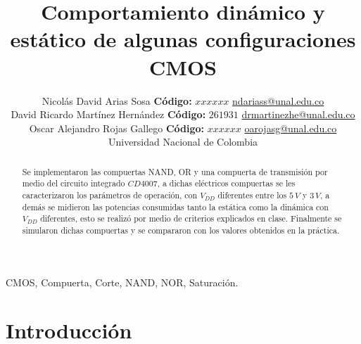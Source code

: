 \documentclass[twocolumn]{IEEEtran}
\begin{document}
\title{Comportamiento dinámico y estático de algunas configuraciones CMOS}
\author{Nicolás David Arias Sosa \textbf{Código:} $xxxxxx$ \url{ndariass@unal.edu.co}\\
	David Ricardo Martínez Hernández \textbf{Código:} $261931$ \url{drmartinezhe@unal.edu.co}\\
	Oscar Alejandro Rojas Gallego \textbf{Código:} $xxxxxx$ \url{oarojasg@unal.edu.co}\\
	Universidad Nacional de Colombia}
\maketitle
\begin{abstract}
 Se implementaron las compuertas NAND, OR y una compuerta de transmisión por medio del circuito integrado $CD4007$, a dichas eléctricos compuertas se les caracterizaron los parámetros de operación, con $V_{DD}$ diferentes entre los $5\, V$ y $3\, V$, a demás se midieron las potencias consumidas tanto la estática como la dinámica con $V_{DD}$ diferentes, esto se realizó por medio de criterios explicados en clase. Finalmente se simularon dichas compuertas y se compararon con los valores obtenidos en la práctica.
\end{abstract}
\begin{keywords}
 CMOS, Compuerta, Corte, NAND, NOR, Saturación.
\end{keywords}

\section{Introducción}
\end{document}
